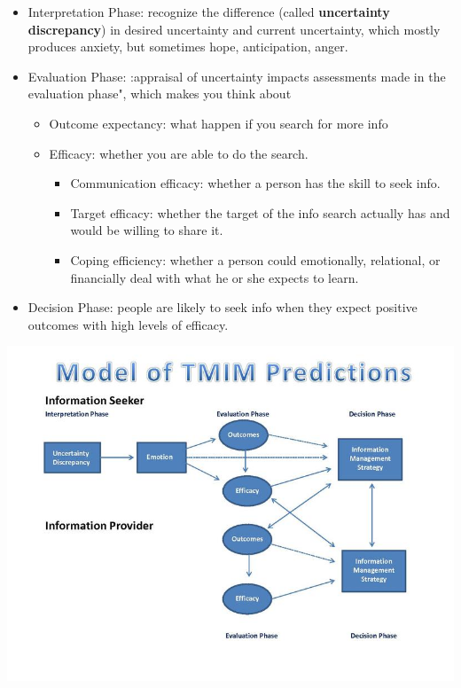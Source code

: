 \documentclass[
]{book}
\providecommand{\tightlist}{%
  \setlength{\itemsep}{0pt}\setlength{\parskip}{0pt}}
\begin{document}
\begin{itemize}
\item
  Interpretation Phase: recognize the difference (called \textbf{uncertainty discrepancy}) in desired uncertainty and
  current uncertainty, which mostly produces anxiety, but sometimes hope, anticipation, anger.\\
\item
  Evaluation Phase: :appraisal of uncertainty impacts assessments made in the evaluation phase", which makes you think
  about

  \begin{itemize}
  \item
    Outcome expectancy: what happen if you search for more info\\
  \item
    Efficacy: whether you are able to do the search.

    \begin{itemize}
    \tightlist
    \item
      Communication efficacy: whether a person has the skill to seek info.\\
    \item
      Target efficacy: whether the target of the info search actually has and would be willing to share it.\\
    \item
      Coping efficiency: whether a person could emotionally, relational, or financially deal with what he or she
      expects to learn.
    \end{itemize}
  \end{itemize}
\item
  Decision Phase: people are likely to seek info when they expect positive outcomes with high levels of efficacy.
\end{itemize}

\begin{center}\includegraphics[width=11.11in]{images/Model of TMIM Predicitons} \end{center}
\end{document}
